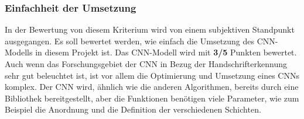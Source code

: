 \subsubsection{Einfachheit der Umsetzung}
In der Bewertung von diesem Kriterium wird von einem subjektiven Standpunkt ausgegangen. Es soll bewertet werden, wie einfach die Umsetzung des CNN-Modells in diesem Projekt ist.
Das CNN-Modell wird mit \textbf{3/5} Punkten bewertet.
Auch wenn das Forschungsgebiet der CNN in Bezug der Handschrifterkennung sehr gut beleuchtet ist, ist vor allem die Optimierung und Umsetzung eines CNNs komplex.
Der CNN wird, ähnlich wie die anderen Algorithmen, bereits durch eine Bibliothek bereitgestellt, aber die Funktionen benötigen viele Parameter, wie zum Beispiel die Anordnung und die Definition der verschiedenen Schichten.
\newpage
